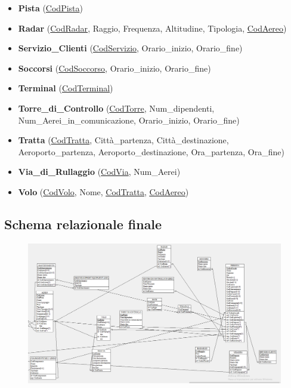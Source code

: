 \begin{itemize}
	\item \textbf{\small Pista} \textsf{\small (\underline{CodPista})}
	\item \textbf{\small Radar} \textsf{\small (\underline{CodRadar}, Raggio, Frequenza, Altitudine, Tipologia, \underline{\underline{CodAereo}})}
	\item \textbf{\small Servizio\_Clienti} \textsf{\small (\underline{CodServizio}, Orario\_inizio, Orario\_fine)}
	\item \textbf{\small Soccorsi} \textsf{\small (\underline{CodSoccorso}, Orario\_inizio, Orario\_fine)}
	\item \textbf{\small Terminal} \textsf{\small (\underline{CodTerminal})}
	\item \textbf{\small Torre\_di\_Controllo} \textsf{\small (\underline{CodTorre}, Num\_dipendenti, Num\_Aerei\_in\_comunicazione, Orario\_inizio, Orario\_fine)}
	\item \textbf{\small Tratta} \textsf{\small (\underline{CodTratta}, Città\_partenza, Città\_destinazione, Aeroporto\_partenza, Aeroporto\_destinazione, Ora\_partenza, Ora\_fine)}
	\item \textbf{\small Via\_di\_Rullaggio} \textsf{\small (\underline{CodVia}, Num\_Aerei)}
	\item \textbf{\small Volo} \textsf{\small (\underline{CodVolo}, Nome, \underline{\underline{CodTratta}}, \underline{\underline{CodAereo}})}
\end{itemize}

\flushleft


\newpage

\subsection{Schema relazionale finale} %


\begin{figure}
	\includegraphics[width=1.2\textwidth]{./img/Schema_Logico/Schema_Logico1.png} %
	\label{fig:logico1}
\end{figure}

